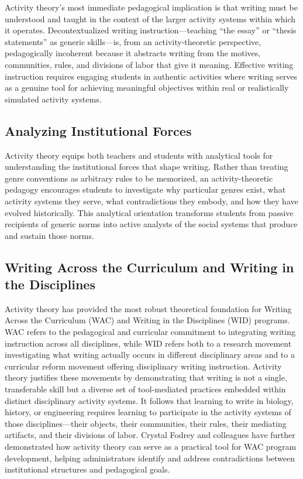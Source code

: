 \documentclass[12pt]{article}
\begin{document}
Activity theory's most immediate pedagogical implication is that writing must be understood and taught in the context of the larger activity systems within which it operates. Decontextualized writing instruction---teaching ``the essay'' or ``thesis statements'' as generic skills---is, from an activity-theoretic perspective, pedagogically incoherent because it abstracts writing from the motives, communities, rules, and divisions of labor that give it meaning. Effective writing instruction requires engaging students in authentic activities where writing serves as a genuine tool for achieving meaningful objectives within real or realistically simulated activity systems.

\subsection{Analyzing Institutional Forces}

Activity theory equips both teachers and students with analytical tools for understanding the institutional forces that shape writing. Rather than treating genre conventions as arbitrary rules to be memorized, an activity-theoretic pedagogy encourages students to investigate why particular genres exist, what activity systems they serve, what contradictions they embody, and how they have evolved historically. This analytical orientation transforms students from passive recipients of generic norms into active analysts of the social systems that produce and sustain those norms.

\subsection{Writing Across the Curriculum and Writing in the Disciplines}

Activity theory has provided the most robust theoretical foundation for Writing Across the Curriculum (WAC) and Writing in the Disciplines (WID) programs. WAC refers to the pedagogical and curricular commitment to integrating writing instruction across all disciplines, while WID refers both to a research movement investigating what writing actually occurs in different disciplinary areas and to a curricular reform movement offering disciplinary writing instruction. Activity theory justifies these movements by demonstrating that writing is not a single, transferable skill but a diverse set of tool-mediated practices embedded within distinct disciplinary activity systems. It follows that learning to write in biology, history, or engineering requires learning to participate in the activity systems of those disciplines---their objects, their communities, their rules, their mediating artifacts, and their divisions of labor. Crystal Fodrey and colleagues have further demonstrated how activity theory can serve as a practical tool for WAC program development, helping administrators identify and address contradictions between institutional structures and pedagogical goals.
\end{document}
